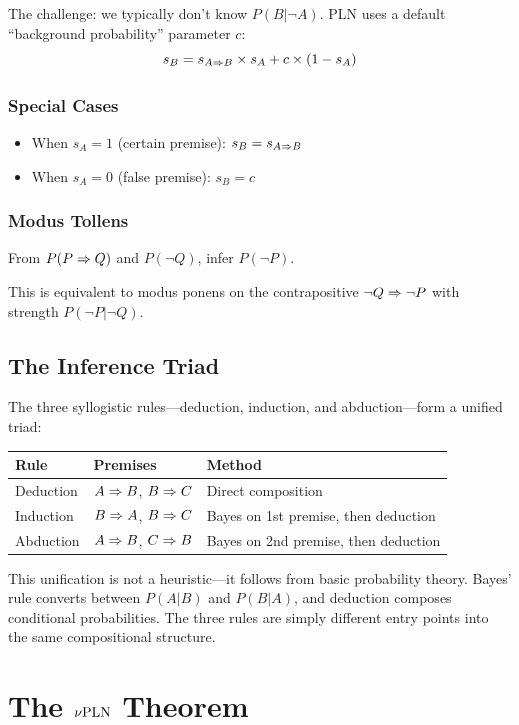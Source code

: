 \documentclass[]{article}
\begin{document}
The challenge: we typically don't know $P(B|\neg A)$.  PLN uses a
default ``background probability'' parameter $c$:
$$s_B = s_{A \Rightarrow B} \times s_A + c \times (1 - s_A)$$

\subsubsection{Special Cases}
\begin{itemize}
\item When $s_A = 1$ (certain premise): $s_B = s_{A \Rightarrow B}$
\item When $s_A = 0$ (false premise): $s_B = c$
\end{itemize}

\subsubsection{Modus Tollens}
From $P(P \Rightarrow Q)$ and $P(\neg Q)$, infer $P(\neg P)$.

This is equivalent to modus ponens on the contrapositive $\neg Q \Rightarrow
\neg P$ with strength $P(\neg P | \neg Q)$.

\subsection{The Inference Triad}
\label{sec:triad}
The three syllogistic rules---deduction, induction, and
abduction---form a unified triad:
\begin{center}
\begin{tabular}{lll}
\textbf{Rule} & \textbf{Premises} & \textbf{Method} \\
\hline
Deduction & $A \Rightarrow B$, $B \Rightarrow C$ & Direct composition \\
Induction & $B \Rightarrow A$, $B \Rightarrow C$ & Bayes on 1st premise, then deduction \\
Abduction & $A \Rightarrow B$, $C \Rightarrow B$ & Bayes on 2nd premise, then deduction \\
\end{tabular}
\end{center}

This unification is not a heuristic---it follows from basic probability
theory.  Bayes' rule converts between $P(A|B)$ and $P(B|A)$, and
deduction composes conditional probabilities.  The three rules are
simply different entry points into the same compositional structure.

\section{The \texorpdfstring{$\nu\textup{PLN}$}{nuPLN} Theorem}
\label{sec:convergence}
\end{document}
